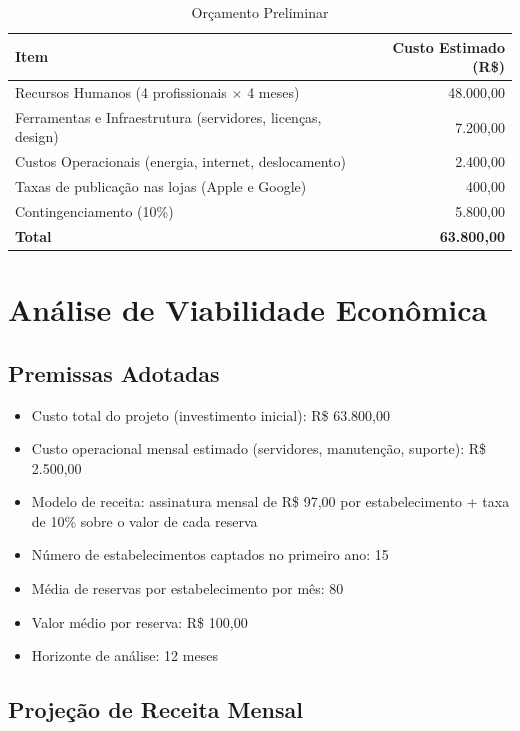 \documentclass[12pt,a4paper,oneside]{report}
\begin{document}
\begin{table}[htbp]
\centering
\caption{Orçamento Preliminar}
\begin{tabular}{p{9cm} r}
\toprule
\textbf{Item} & \textbf{Custo Estimado (R\$)} \\
\midrule
Recursos Humanos (4 profissionais $\times$ 4 meses) & 48.000,00 \\
Ferramentas e Infraestrutura (servidores, licenças, design) & 7.200,00 \\
Custos Operacionais (energia, internet, deslocamento) & 2.400,00 \\
Taxas de publicação nas lojas (Apple e Google) & 400,00 \\
Contingenciamento (10\%) & 5.800,00 \\
\midrule
\textbf{Total} & \textbf{63.800,00} \\
\bottomrule
\end{tabular}
\end{table}

\section{Análise de Viabilidade Econômica}

\subsection{Premissas Adotadas}

\begin{itemize}
    \item Custo total do projeto (investimento inicial): R\$ 63.800,00
    \item Custo operacional mensal estimado (servidores, manutenção, suporte): R\$ 2.500,00
    \item Modelo de receita: assinatura mensal de R\$ 97,00 por estabelecimento + taxa de 10\% sobre o valor de cada reserva
    \item Número de estabelecimentos captados no primeiro ano: 15
    \item Média de reservas por estabelecimento por mês: 80
    \item Valor médio por reserva: R\$ 100,00
    \item Horizonte de análise: 12 meses
\end{itemize}

\subsection{Projeção de Receita Mensal}
\end{document}
